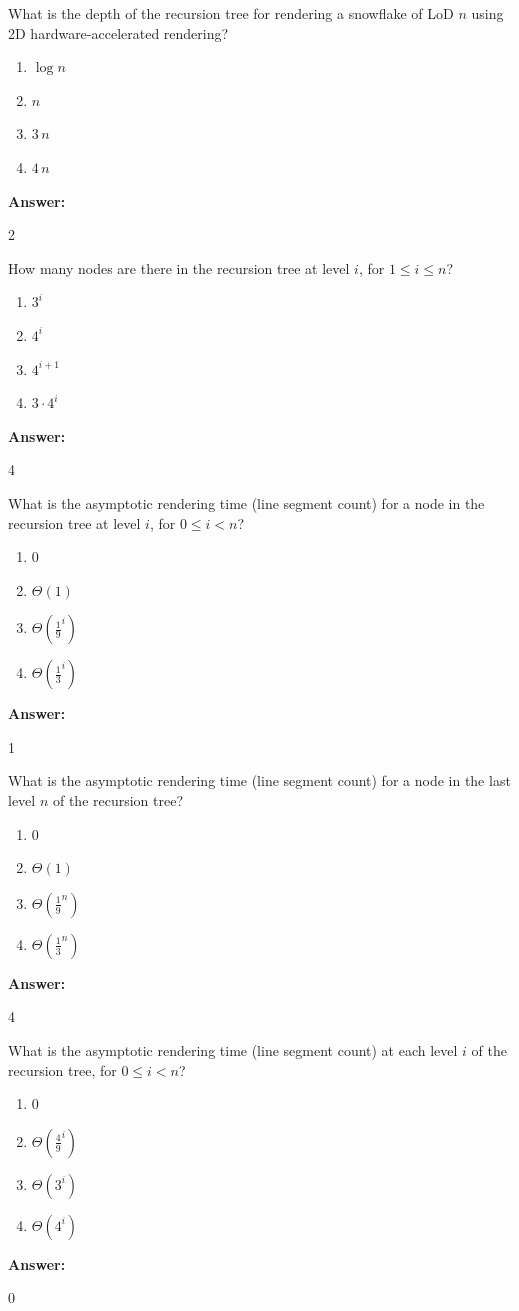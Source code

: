 \documentclass[12pt,twoside]{article}
\newcommand{\answer}{
 \par\medskip
 \textbf{Answer:}
}
\newcommand{\answerIf}{ \answer
2
}
\newcommand{\answerIg}{ \answer
4
}
\newcommand{\answerIh}{ \answer
1
}
\newcommand{\answerIi}{ \answer
4
}
\newcommand{\answerIj}{ \answer
0
}
\begin{document}
\begin{problems}
\begin{problemparts}
  \problempart {} What is the depth of the recursion tree for rendering a
  snowflake of LoD $n$ using 2D hardware-accelerated rendering?
    \begin{enumerate}
      \item $\log n$
      \item $n$
      \item $3 \, n$
      \item $4 \, n$
    \end{enumerate}
\answerIf

  \problempart {} How many nodes are there in the recursion tree at level
  $i$, for $1 \le i \le n$?
    \begin{enumerate}
      \item $3 ^ i$
      \item $4 ^ i$
      \item $4 ^ {i + 1}$
      \item $3 \cdot 4 ^ i$
    \end{enumerate}
\answerIg

  \problempart {} What is the asymptotic rendering time (line segment count)
  for a node in the recursion tree at level $i$, for $0 \le i < n$?
    \begin{enumerate}
      \item $0$
      \item $\Theta(1)$
      \item $\Theta(\frac{1}{9}^i)$
      \item $\Theta(\frac{1}{3}^i)$
    \end{enumerate}
\answerIh

  \problempart {} What is the asymptotic rendering time (line segment count)
  for a node in the last level $n$ of the recursion tree?
    \begin{enumerate}
      \item $0$
      \item $\Theta(1)$
      \item $\Theta(\frac{1}{9}^n)$
      \item $\Theta(\frac{1}{3}^n)$
    \end{enumerate}
\answerIi

  \problempart {} What is the asymptotic rendering time (line segment count) at
  each level $i$ of the recursion tree, for $0 \le i < n$?
    \begin{enumerate}
      \item 0
      \item $\Theta(\frac{4}{9} ^ i)$
      \item $\Theta(3 ^ i)$
      \item $\Theta(4 ^ i)$
    \end{enumerate}
\answerIj


\end{problemparts}
\end{problems}
\end{document}
